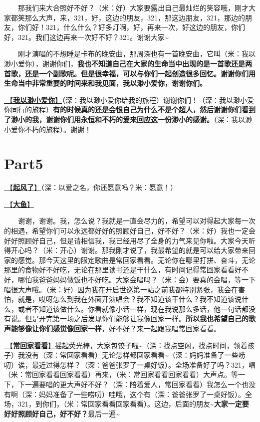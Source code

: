 \documentclass[]{ctexbook}
\begin{document}
  那我们来大合照好不好？（米：好）大家要露出自己最灿烂的笑容哦，刚才大家都笑那么大声，来，321，好，这边的朋友，321，那这边朋友，321，那边的朋友，你们好！321，什么什么？好多灯啊，好，再来一次，好这边的朋友，你们好，321。我们这边再来一次好不好？321。谢谢大家\textasciitilde{}

  刚才演唱的不想睡是卡布的晚安曲，那周深也有一首晚安曲，它叫（米：我以渺小爱你），谢谢你们，\textbf{我也不知道自己在大家的生命当中出现的是一首歌还是两首歌，还是一个副歌呢。但是很幸福，可以与你们一起创造很多回忆。谢谢你们用生命当中非常重要的时间来和我见面，我以渺小爱你，谢谢你们。}

\hyperref[loving-you-in-my-humble-way]{🎵【\textbf{我以渺小爱你}】}（深：我以渺小爱你给我的旅程）谢谢你们！（深：我以渺小爱你同行的旅程）\textbf{有的时候真的还是会恨自己为什么不是个超人，然后谢谢你们看到了渺小的我，谢谢你们用永恒和不朽的爱来回应这一份渺小的感谢。}（深：我以渺小爱你不朽的旅程）。谢谢！

\newpage

\section{Part5}\label{Seattle-20250305-part5}

\hyperref[the-wind-rises]{🎵【\textbf{起风了}】}（深：以爱之名，你还愿意吗？米：愿意！）

\hyperref[big-fish]{🎵【\textbf{大鱼}】}

  谢谢，谢谢。我，怎么说？我就是一直会尽力的，希望可以对得起大家每一次的相遇，希望你们可以永远都好好的照顾好自己，好不好？（米：好）我也一定会好好照顾好自己，但是请相信我，我已经用尽了全身的力气来见你啦。大家今天听得开心吗？（米：开心）谢谢。那我刚才说了，我最希望的就是可以给大家带来回家的感觉。那今天这里的限定歌曲是常回家看看。无论你在哪里打拼、奋斗，无论那里的食物好不好吃，无论在那里读书还是干什么，有时间记得常回家看看好不好，哪怕我爸爸妈妈做饭也不好吃。大家会唱吗？（米：会）要真的会唱，等一下唱很大声哦。（米：好）因为我在开启世巡第一站之前我都特别紧张，我会在害怕，就是，哎呀怎么到我在外面开演唱会？我不知道该干什么？我不知道该说什么，或者不知道该做什么。你看就像小话一样，现在我说那么多话，他一句话都没有说。但是开完第一场之后发现你们能够让我像回家一样。\textbf{所以我也希望自己的歌声能够像让你们感觉像回家一样}，好不好？来一起跟我唱常回家看看。

\hyperref[often-back-home]{🎵【\textbf{常回家看看}】}摇起荧光棒，大家包饺子啦\textasciitilde（深：找点空闲，找点时间，领着孩子）我没有（深：常回家看看）无论怎样都回家看看\textasciitilde（深：妈妈准备了一些唠叨）诶，最近过得怎样？（深：爸爸张罗了一桌好饭）。全场准备好了吗？321，唱（米：常回家看看回家看看）再来，（米：常回家看看回家看看）大声点。等一下，下一遍要唱的更大声好不好？（深：陪着爱人，常回家看看）我怎么一个也没有啊（深：妈妈准备了一些唠叨）哇哦，这个有（深：爸爸张罗了一桌好饭）。全场，321，到你们，（米：常回家看看回家看看）。这边，后面的朋友\textasciitilde{}\textbf{大家一定要好好照顾好自己，好不好？}最后一遍\textasciitilde{}
\end{document}
